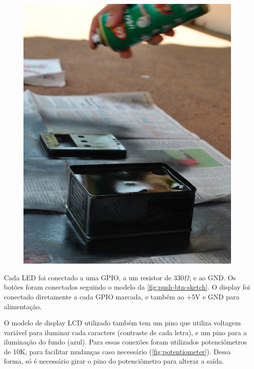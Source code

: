 \begin{figure}[htb]
\begin{minipage}{0.45\textwidth}
		\includegraphics[width=1\textwidth]{img/pintar-2.jpg}
	\end{minipage}
\end{figure}

Cada LED foi conectado a uma GPIO, a um resistor de 330$\Omega$, e ao GND. Os botões foram conectados seguindo o modelo da \autoref{fig:push-btn-sketch}. O display foi conectado diretamente a cada GPIO marcada, e também ao +5V e GND para alimentação. 

O modelo de display LCD utilizado também tem um pino que utiliza voltagem variável para iluminar cada caractere (contraste de cada letra), e um pino para a iluminação do fundo (azul). Para essas conexões foram utilizados potenciômetros de 10K, para facilitar mudanças caso necessário (\autoref{fig:potentiometer}). Dessa forma, só é necessário girar o pino do potenciômetro para alterar a saída.

